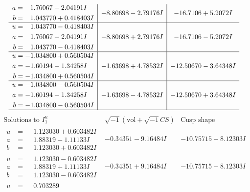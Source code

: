 \documentclass[1p]{elsarticle_modified}
\theoremstyle{definition}
\newcommand{\I}{\sqrt{-1}}
\begin{document}
$$\begin{array}{c|c|c}
\begin{aligned}
a &= \phantom{-}1.76067 - 2.04191 I \\
b &= \phantom{-}1.043770 + 0.418403 I\end{aligned}
 & -8.80698 - 2.79176 I & -16.7106 + 5.2072 I \\ \hline\begin{aligned}
u &= \phantom{-}1.043770 - 0.418403 I \\
a &= \phantom{-}1.76067 + 2.04191 I \\
b &= \phantom{-}1.043770 - 0.418403 I\end{aligned}
 & -8.80698 + 2.79176 I & -16.7106 - 5.2072 I \\ \hline\begin{aligned}
u &= -1.034800 + 0.560504 I \\
a &= -1.60194 - 1.34258 I \\
b &= -1.034800 + 0.560504 I\end{aligned}
 & -1.63698 + 4.78532 I & -12.50670 - 3.64348 I \\ \hline\begin{aligned}
u &= -1.034800 - 0.560504 I \\
a &= -1.60194 + 1.34258 I \\
b &= -1.034800 - 0.560504 I\end{aligned}
 & -1.63698 - 4.78532 I & -12.50670 + 3.64348 I\\
 \hline 
 \end{array}$$\newpage$$\begin{array}{c|c|c}  
\text{Solutions to }I^u_{1}& \I (\text{vol} + \sqrt{-1}CS) & \text{Cusp shape}\\
 \hline 
\begin{aligned}
u &= \phantom{-}1.123030 + 0.603482 I \\
a &= \phantom{-}1.88319 - 1.11133 I \\
b &= \phantom{-}1.123030 + 0.603482 I\end{aligned}
 & -0.34351 - 9.16484 I & -10.75715 + 8.12303 I \\ \hline\begin{aligned}
u &= \phantom{-}1.123030 - 0.603482 I \\
a &= \phantom{-}1.88319 + 1.11133 I \\
b &= \phantom{-}1.123030 - 0.603482 I\end{aligned}
 & -0.34351 + 9.16484 I & -10.75715 - 8.12303 I \\ \hline\begin{aligned}
u &= \phantom{-}0.703289\phantom{ +0.000000I} \\

\end{aligned}
\end{array}$$
\end{document}
